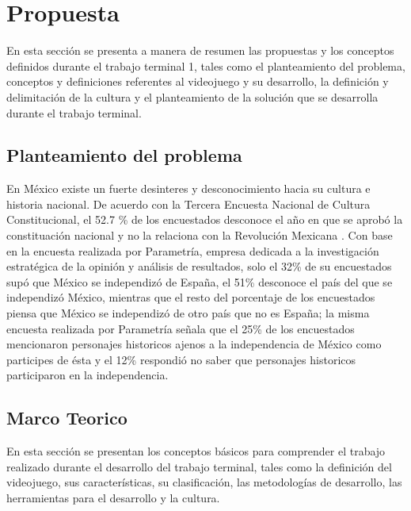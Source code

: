 \section{Propuesta}
En esta sección se presenta a manera de resumen las propuestas y los conceptos 
definidos durante el trabajo terminal 1, tales como el planteamiento del problema, 
conceptos y definiciones referentes al videojuego y su desarrollo, la definición 
y delimitación de la cultura y el planteamiento de la solución que se desarrolla 
durante el trabajo terminal.  

\subsection{Planteamiento del problema}
En México existe un fuerte desinteres y desconocimiento hacia su cultura e historia 
nacional. De acuerdo con la Tercera Encuesta Nacional de Cultura Constitucional, 
el 52.7 \% de los encuestados desconoce el año en que se aprobó la constituación 
nacional y no la relaciona con la Revolución Mexicana \cite{RefConsti}. Con base 
en la encuesta realizada por Parametría, empresa dedicada a la investigación 
estratégica de la opinión y análisis de resultados, solo el 32\% de su encuestados 
supó que México se independizó de España, el 51\% desconoce el país del que se 
independizó México, mientras que el resto del porcentaje de los encuestados 
piensa que México se independizó de otro país que no es España; la misma 
encuesta realizada por Parametría señala que el 25\% de los encuestados mencionaron 
personajes historicos ajenos a la independencia de México como participes de 
ésta y el 12\% respondió no saber que personajes historicos participaron en la 
independencia\cite{RefParametria}. 
 
\subsection{Marco Teorico}
En esta sección se presentan los conceptos básicos para comprender el trabajo 
realizado durante el desarrollo del trabajo terminal, tales como la definición 
del videojuego, sus características, su clasificación, las metodologías de 
desarrollo, las herramientas para el desarrollo y la cultura. 

